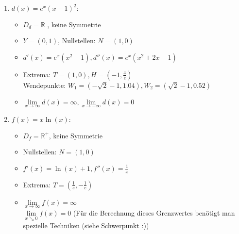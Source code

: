 \begin{enumerate}
\begin{enumerate}
\begin{itemize}
                  Wendepunkte: $W = (2.03 + k\pi, 0)$
            \item $\lim\limits_{x \to \pm\infty} c(x) $ existiert nicht.
        \end{itemize}
        \item \( d(x) = e^x(x - 1)^2 \):
            \begin{itemize}
            \item $D_d = \mathbb{R}$ , keine Symmetrie
            \item $Y = (0, 1)$, Nullstellen: $N = (1,0)$
            \item $d'(x) = e^x(x^2-1), d''(x) = e^x (x^2+2x-1)$
            \item Extrema: $T=(1,0), H=(-1, \frac{4}{e})$ \\
                  Wendepunkte: $W_1 = (-\sqrt{2}-1, 1.04), W_2 =(\sqrt{2}-1, 0.52)$
            \item $\lim\limits_{x \to \infty} d(x) = \infty, \lim\limits_{x \to -\infty} d(x) = 0$
            \end{itemize}
        \item \( f(x) = x\ln(x) \): 
            \begin{itemize}
            \item $D_f = \mathbb{R^+}$, keine Symmetrie
            \item Nullstellen: $N = (1,0)$
            \item $f'(x) = \ln(x) + 1, f''(x) = \frac{1}{x}$
            \item Extrema: $T=\left(\frac{1}{e}, -\frac{1}{e}\right)$ 
            \item $\lim\limits_{x \to \infty} f(x) = \infty$ \\
            $\lim\limits_{x \searrow 0} f(x) = 0$ (Für die Berechnung dieses Grenzwertes benötigt man spezielle Techniken (siehe Schwerpunkt :))
            \end{itemize}
    \end{enumerate}
\end{enumerate}

